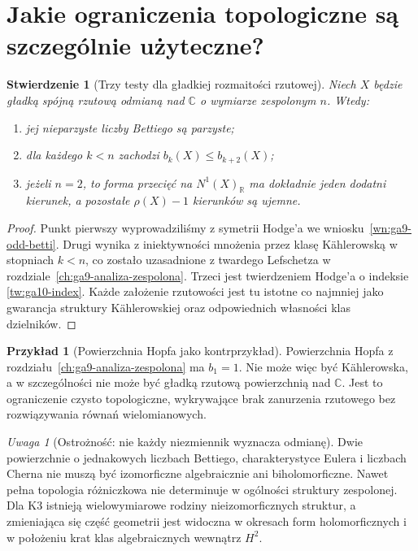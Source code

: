 \documentclass[11pt,a4paper,openany]{report}
\numberwithin{equation}{section}
\theoremstyle{plain}
\newtheorem{stwierdzenie}[twierdzenie]{Stwierdzenie}
\theoremstyle{definition}
\newtheorem{przyklad}[twierdzenie]{Przykład}
\theoremstyle{remark}
\newtheorem{uwaga}[twierdzenie]{Uwaga}
\newcommand{\R}{\mathbb R}
\newcommand{\C}{\mathbb C}
\begin{document}
\section{Jakie ograniczenia topologiczne są szczególnie użyteczne?}
\label{sec:ga10-konsekwencje}

\begin{stwierdzenie}[Trzy testy dla gładkiej rozmaitości rzutowej]
Niech $X$ będzie gładką spójną rzutową odmianą nad $\C$
o wymiarze zespolonym $n$. Wtedy:
\begin{enumerate}[label=\arabic*)]
\item jej nieparzyste liczby Bettiego są parzyste;
\item dla każdego $k<n$ zachodzi $b_k(X)\le b_{k+2}(X)$;
\item jeżeli $n=2$, to forma przecięć na $N^1(X)_{\R}$
ma dokładnie jeden dodatni kierunek, a pozostałe
$\rho(X)-1$ kierunków są ujemne.
\end{enumerate}
\end{stwierdzenie}
\begin{proof}
Punkt pierwszy wyprowadziliśmy z symetrii Hodge'a
we wniosku~\ref{wn:ga9-odd-betti}. Drugi wynika z
iniektywności mnożenia przez klasę Kählerowską
w stopniach $k<n$, co zostało uzasadnione z twardego
Lefschetza w rozdziale~\ref{ch:ga9-analiza-zespolona}.
Trzeci jest twierdzeniem Hodge'a o indeksie
\ref{tw:ga10-index}. Każde założenie rzutowości
jest tu istotne co najmniej jako gwarancja struktury
Kählerowskiej oraz odpowiednich własności klas dzielników.
\end{proof}

\begin{przyklad}[Powierzchnia Hopfa jako kontrprzykład]
Powierzchnia Hopfa z rozdziału~\ref{ch:ga9-analiza-zespolona}
ma $b_1=1$. Nie może więc być Kählerowska,
a w szczególności nie może być gładką rzutową
powierzchnią nad $\C$. Jest to ograniczenie
czysto topologiczne, wykrywające brak zanurzenia
rzutowego bez rozwiązywania równań wielomianowych.
\end{przyklad}

\begin{uwaga}[Ostrożność: nie każdy niezmiennik wyznacza odmianę]
Dwie powierzchnie o jednakowych liczbach Bettiego,
charakterystyce Eulera i liczbach Cherna nie muszą być
izomorficzne algebraicznie ani biholomorficzne.
Nawet pełna topologia różniczkowa nie determinuje
w ogólności struktury zespolonej. Dla K3 istnieją
wielowymiarowe rodziny nieizomorficznych struktur,
a zmieniająca się część geometrii jest widoczna
w okresach form holomorficznych i w położeniu krat
klas algebraicznych wewnątrz $H^2$.
\end{uwaga}
\end{document}
